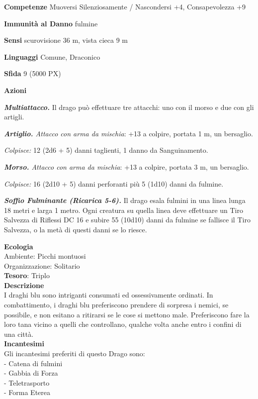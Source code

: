 \begin{multicols}{2}
	\textbf{Competenze} Muoversi Silenziosamente / Nascondersi +4, Consapevolezza +9

	\textbf{Immunità al Danno} fulmine

	\textbf{Sensi} scurovisione 36 m, vista cieca 9 m

	\textbf{Linguaggi} Comune, Draconico

	\textbf{Sfida} 9 (5000 PX)

	\textbf{Azioni}

	\textit{\textbf{Multiattacco.}} Il drago può effettuare tre attacchi: uno con il morso e due con gli artigli.

	\textit{\textbf{Artiglio.} Attacco con arma da mischia}: +13 a colpire, portata 1 m, un bersaglio.

	\textit{Colpisce:} 12 (2d6 + 5) danni taglienti, 1 danno da Sanguinamento.

	\textit{\textbf{Morso.} Attacco con arma da mischia}: +13 a colpire, portata 3 m, un bersaglio.

	\textit{Colpisce:} 16 (2d10 + 5) danni perforanti più 5 (1d10) danni da fulmine.

	\textit{\textbf{Soffio Fulminante (Ricarica 5-6).}} Il drago esala fulmini in una linea lunga 18 metri e larga 1 metro. Ogni creatura su quella linea deve effettuare un Tiro Salvezza di Riflessi DC 16 e subire 55 (10d10) danni da fulmine se fallisce il Tiro Salvezza, o la metà di questi danni se lo riesce.

	\textbf{Ecologia}\\
	Ambiente: Picchi montuosi\\
	Organizzazione: Solitario\\
	\textbf{Tesoro}: Triplo\\
	\textbf{Descrizione}\\
	I draghi blu sono intriganti consumati ed ossessivamente ordinati. In combattimento, i draghi blu preferiscono prendere di sorpresa i nemici, se possibile, e non esitano a ritirarsi se le cose si mettono male. Preferiscono fare la loro tana vicino a quelli che controllano, qualche volta anche entro i confini di una città.\\
	\textbf{Incantesimi}\\
	Gli incantesimi preferiti di questo Drago sono:\\
	- Catena di fulmini\\
	- Gabbia di Forza\\
	- Teletrasporto\\
	- Forma Eterea



\end{multicols}

